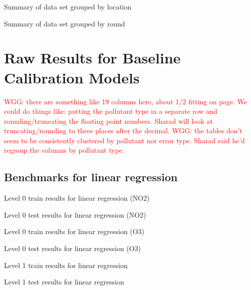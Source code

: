 \documentclass[journal abbreviation, manuscript]{copernicus}
\newcommand\todo[1]{\textcolor{red}{#1}}
\begin{document}
\begin{table}[H]
\scriptsize

\caption{Summary of data set grouped by location}
\label{tab:locationsummary}
\end{table}

\begin{table}[H]
\scriptsize

\caption{Summary of data set grouped by round}
\label{tab:roundsummary}
\end{table}

\section{Raw Results for Baseline Calibration Models}
\label{sec:simpleresults}
\todo{WGG: there are something like 19 columns here, about 1/2 fitting on page.  We could do things like: putting the pollutant type in a separate row and rounding/truncating the floating point numbers.  Sharad will look at truncating/rounding to three places after the decimal.}
\todo{WGG: the tables don't seem to be consistently clustered by pollutant nor error type.  Sharad said he'd regroup the columns by pollutant type.}

\subsection{Benchmarks for linear regression}
\label{sec:results-lr}

\begin{table}[H]
\centering
\scriptsize

\caption{Level 0 train results for linear regression (NO2)}
\end{table}
\begin{table}[H]
\centering
\scriptsize

\caption{Level 0 test results for linear regression (NO2)}
\end{table}

\begin{table}[H]
\centering
\scriptsize

\caption{Level 0 train results for linear regression (O3)}
\end{table}
\begin{table}[H]
\centering
\scriptsize

\caption{Level 0 test results for linear regression (O3)}
\end{table}

\begin{table}[H]
\centering
\scriptsize

\caption{Level 1 train results for linear regression}
\end{table}
\begin{table}[H]
\centering
\scriptsize

\caption{Level 1 test results for linear regression}
\end{table}
\end{document}
